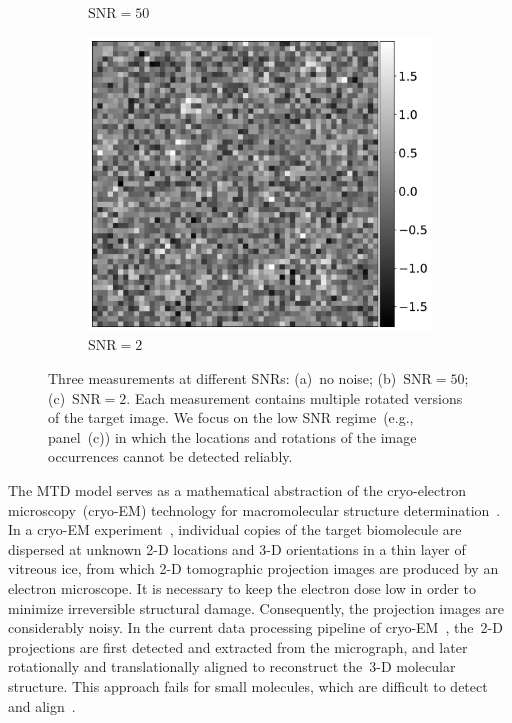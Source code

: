 \documentclass{article}
\begin{document}
\begin{figure}[!tb]
\begin{subfigure}[ht]{0.30\columnwidth}
		\caption{$\text{SNR} = 50$}
	\end{subfigure}
	\hfill
	\begin{subfigure}[ht]{0.30\columnwidth}
		\centering
		\includegraphics[width=\columnwidth]{figures/Micrographs_noise_b.pdf}
		\caption{$\text{SNR} = 2$}
	\end{subfigure}
	\caption{Three measurements at different SNRs: (a)~no noise; (b)~\mbox{$\text{SNR} = 50$}; (c)~\mbox{$\text{SNR} = 2$}. Each measurement contains multiple rotated versions of the target image. We focus on the low SNR regime~{(e.g., panel~(c))} in which the locations and rotations of the image occurrences cannot be detected reliably.}
\label{fig:Micrographs_noise}
\end{figure}

The MTD model serves as a mathematical abstraction of the cryo-electron microscopy~(\mbox{cryo-EM}) technology for macromolecular structure determination~\cite{henderson1995potential, nogales2016development, bai2015cryo}. In a \mbox{cryo-EM} experiment~\cite{frank2006three}, individual copies of the target biomolecule are dispersed at unknown \mbox{2-D} locations and \mbox{3-D} orientations in a thin layer of vitreous ice, from which \mbox{2-D} tomographic projection images are produced by an electron microscope.
It is necessary to keep the electron dose low in order to minimize  irreversible structural damage. Consequently, the projection images are considerably noisy. In the current data processing pipeline of \mbox{cryo-EM}~\cite{bendory2020single, singer2020computational, scheres2012relion, punjani2017cryosparc}, the~\mbox{2-D} projections are first detected and extracted from the micrograph, and later rotationally and translationally aligned to reconstruct the~\mbox{3-D} molecular structure. This approach fails for small molecules, which are difficult to detect and align~\cite{bendory2018toward, henderson1995potential, bendory2020single, aguerrebere2016fundamental}.
\end{document}
